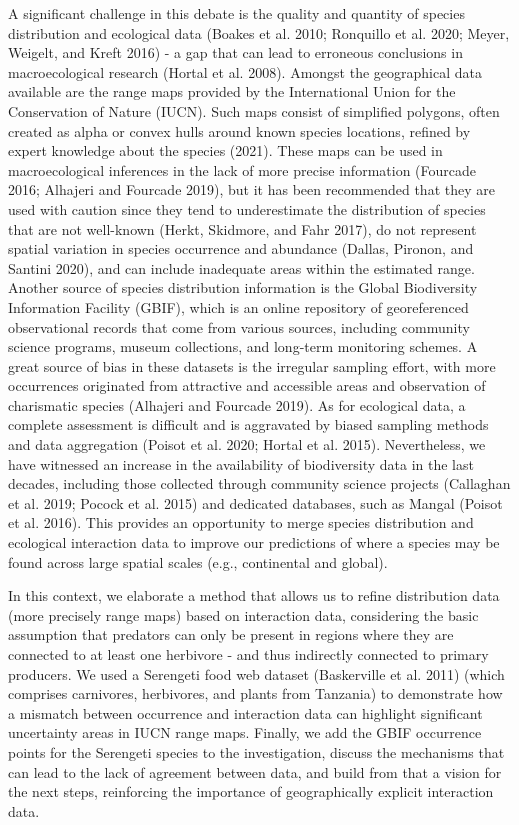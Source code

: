 \documentclass[10pt,oneside]{article}
\begin{document}
A significant challenge in this debate is the quality and quantity of
species distribution and ecological data (Boakes et al. 2010; Ronquillo
et al. 2020; Meyer, Weigelt, and Kreft 2016) - a gap that can lead to
erroneous conclusions in macroecological research (Hortal et al. 2008).
Amongst the geographical data available are the range maps provided by
the International Union for the Conservation of Nature (IUCN). Such maps
consist of simplified polygons, often created as alpha or convex hulls
around known species locations, refined by expert knowledge about the
species (2021). These maps can be used in macroecological inferences in
the lack of more precise information (Fourcade 2016; Alhajeri and
Fourcade 2019), but it has been recommended that they are used with
caution since they tend to underestimate the distribution of species
that are not well-known (Herkt, Skidmore, and Fahr 2017), do not
represent spatial variation in species occurrence and abundance (Dallas,
Pironon, and Santini 2020), and can include inadequate areas within the
estimated range. Another source of species distribution information is
the Global Biodiversity Information Facility (GBIF), which is an online
repository of georeferenced observational records that come from various
sources, including community science programs, museum collections, and
long-term monitoring schemes. A great source of bias in these datasets
is the irregular sampling effort, with more occurrences originated from
attractive and accessible areas and observation of charismatic species
(Alhajeri and Fourcade 2019). As for ecological data, a complete
assessment is difficult and is aggravated by biased sampling methods and
data aggregation (Poisot et al. 2020; Hortal et al. 2015). Nevertheless,
we have witnessed an increase in the availability of biodiversity data
in the last decades, including those collected through community science
projects (Callaghan et al. 2019; Pocock et al. 2015) and dedicated
databases, such as Mangal (Poisot et al. 2016). This provides an
opportunity to merge species distribution and ecological interaction
data to improve our predictions of where a species may be found across
large spatial scales (e.g., continental and global).

In this context, we elaborate a method that allows us to refine
distribution data (more precisely range maps) based on interaction data,
considering the basic assumption that predators can only be present in
regions where they are connected to at least one herbivore - and thus
indirectly connected to primary producers. We used a Serengeti food web
dataset (Baskerville et al. 2011) (which comprises carnivores,
herbivores, and plants from Tanzania) to demonstrate how a mismatch
between occurrence and interaction data can highlight significant
uncertainty areas in IUCN range maps. Finally, we add the GBIF
occurrence points for the Serengeti species to the investigation,
discuss the mechanisms that can lead to the lack of agreement between
data, and build from that a vision for the next steps, reinforcing the
importance of geographically explicit interaction data.
\end{document}
